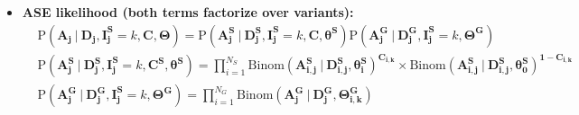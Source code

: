 \documentclass[11pt,a4paper,fullpage]{article}
\def\P{\mathrm{P}}
\theoremstyle{definition}
\theoremstyle{definition}
\theoremstyle{definition}
\numberwithin{equation}{section}
\begin{document}
\begin{itemize}
		\item \textbf{ASE likelihood (both terms factorize over variants):}
		\begin{equation}
		\begin{aligned}
		&\P(\mathbf{A_{j}}\ |\ \mathbf{D_{j}}, \mathbf{I^{S}_{j}} = k, \mathbf{C}, \mathbf{\Theta}) = \P(\mathbf{A^{S}_{j}}\ |\ \mathbf{D^{S}_{j}}, \mathbf{I^{S}_{j}} = k, \mathbf{C}, \mathbf{\theta^{S}}) \P(\mathbf{A^{G}_{j}}\ |\ \mathbf{D^{G}_{j}}, \mathbf{I^{S}_{j}} = k, \mathbf{\Theta^{G}})\\
		&\P(\mathbf{A^{S}_{j}}\ |\ \mathbf{D^{S}_{j}}, \mathbf{I^{S}_{j}} = k, \mathbf{C^{S}}, \mathbf{\theta^{S}}) = \prod_{i=1}^{N_{S}} \mathrm{Binom}(\mathbf{A^S_{i,j}}\ |\ \mathbf{D^S_{i,j}}, \mathbf{\theta^{S}_{i}})^{\mathbf{C_{i,k}}} \times \mathrm{Binom}(\mathbf{A^S_{i,j}}\ |\ \mathbf{D^S_{i,j}}, \mathbf{\theta^{S}_{0}})^{\mathbf{1-C_{i,k}}} \\ 
		&\P(\mathbf{A^{G}_{j}}\ |\ \mathbf{D^{G}_{j}}, \mathbf{I^{S}_{j}} = k, \mathbf{\Theta^{G}}) = \prod_{i=1}^{N_{G}} \mathrm{Binom}(\mathbf{A^{G}_{j}}\ |\ \mathbf{D^{G}_{j}}, \mathbf{\Theta^{G}_{i, k}})
		\end{aligned}
		\end{equation}
		

\end{itemize}
\end{document}
